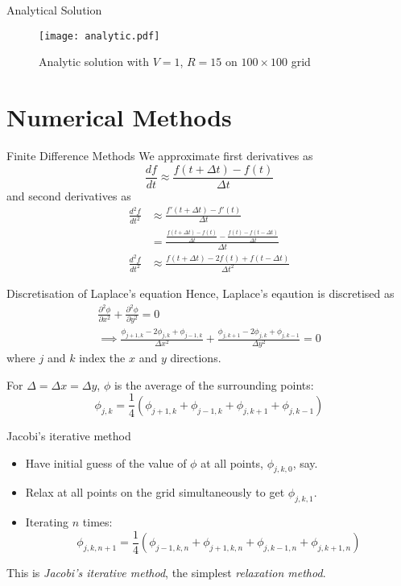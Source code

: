 \documentclass{beamer}
\newcommand{\be}{\begin{equation}}
\newcommand{\ee}{\end{equation}}
\begin{document}
\begin{frame}{Analytical Solution}

\begin{figure}[h!]
\begin{center}
\texttt{[image: analytic.pdf]}
\caption{Analytic solution with $V=1$, $R=15$ on $100\times100$ grid}
\end{center}
\end{figure}

\end{frame}

\section{Numerical Methods}

\begin{frame}{Finite Difference Methods}
We approximate first derivatives as
%
\be
\frac{df}{dt} \approx \frac{f(t+\Delta t) - f(t)}{\Delta t}
\ee
%
and second derivatives as
%
\begin{align}
\frac{d^2 f}{dt^2} &\approx \frac{f'(t+\Delta t) - f'(t)}{\Delta t} \\
		   &= \frac{\frac{f(t+\Delta t) - f(t)}{\Delta t} - \frac{f(t) - f(t-\Delta t)}{\Delta t}}{\Delta t} \\
\frac{d^2 f}{dt^2} &\approx  \frac{f(t+\Delta t) - 2f(t) + f(t-\Delta t)}{\Delta t^2}
\end{align}

\end{frame}

\begin{frame}{Discretisation of Laplace's equation}
Hence, Laplace's eqaution is discretised as
%
\begin{multline}
\frac{\partial^2 \phi}{\partial x^2}+\frac{\partial^2 \phi}{\partial y^2} = 0 \\
\implies
\frac{\phi_{j+1,k}-2\phi_{j,k}+\phi_{j-1,k}}{\Delta x^2} + \frac{\phi_{j,k+1}-2\phi_{j,k}+\phi_{j,k-1}}{\Delta y^2}=0
\end{multline}
%
where $j$ and $k$ index the $x$ and $y$ directions.

For $\Delta = \Delta x = \Delta y$, $\phi$ is the average of the surrounding points:
%
\be
\phi_{j,k}= \frac{1}{4}(\phi_{j+1,k}+\phi_{j-1,k}+\phi_{j,k+1}+\phi_{j,k-1})
\ee

\end{frame}

\begin{frame}{Jacobi's iterative method}

\begin{itemize}
\item Have initial guess of the value of $\phi$ at all points, $\phi_{j,k,0}$, say.
\item Relax at all points on the grid simultaneously to get $\phi_{j,k,1}$.
\item Iterating $n$ times:
%
\be
\phi_{j,k,n+1}= \frac{1}{4}(\phi_{j-1,k,n}+\phi_{j+1,k,n}+\phi_{j,k-1,n}+\phi_{j,k+1,n})
\ee
%
\end{itemize}

This is \emph{Jacobi's iterative method}, the simplest \emph{relaxation method}.
\end{frame}
\end{document}
